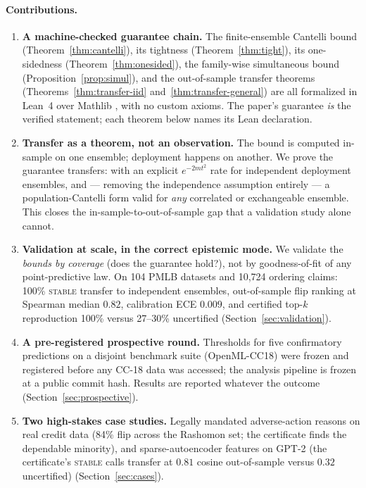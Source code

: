 \documentclass[10pt]{article}
\newcommand{\stab}{\textsc{stable}}
\begin{document}
\paragraph{Contributions.}
\begin{enumerate}[leftmargin=1.5em,itemsep=1pt,topsep=2pt]
\item \textbf{A machine-checked guarantee chain.} The finite-ensemble Cantelli bound
  (Theorem~\ref{thm:cantelli}), its tightness (Theorem~\ref{thm:tight}), its
  one-sidedness (Theorem~\ref{thm:onesided}), the family-wise simultaneous bound
  (Proposition~\ref{prop:simul}), and the out-of-sample transfer theorems
  (Theorems~\ref{thm:transfer-iid} and~\ref{thm:transfer-general}) are all formalized in
  Lean~4 \citep{demoura2021lean4} over Mathlib \citep{mathlib2020}, with no custom
  axioms. The paper's guarantee \emph{is} the verified statement; each theorem below
  names its Lean declaration.
\item \textbf{Transfer as a theorem, not an observation.} The bound is computed
  in-sample on one ensemble; deployment happens on another. We prove the guarantee
  transfers: with an explicit $e^{-2mt^2}$ rate for independent deployment ensembles,
  and --- removing the independence assumption entirely --- a population-Cantelli form
  valid for \emph{any} correlated or exchangeable ensemble. This closes the
  in-sample-to-out-of-sample gap that a validation study alone cannot.
\item \textbf{Validation at scale, in the correct epistemic mode.} We validate the
  \emph{bounds by coverage} (does the guarantee hold?), not by goodness-of-fit of any
  point-predictive law. On 104 PMLB datasets and 10{,}724 ordering claims: 100\% \stab{}
  transfer to independent ensembles, out-of-sample flip ranking at Spearman median
  $0.82$, calibration ECE $0.009$, and certified top-$k$ reproduction 100\% versus
  27--30\% uncertified (Section~\ref{sec:validation}).
\item \textbf{A pre-registered prospective round.} Thresholds for five confirmatory
  predictions on a disjoint benchmark suite (OpenML-CC18) were frozen and registered
  before any CC-18 data was accessed; the analysis pipeline is frozen at a public commit
  hash. Results are reported whatever the outcome (Section~\ref{sec:prospective}).
\item \textbf{Two high-stakes case studies.} Legally mandated adverse-action reasons on
  real credit data (84\% flip across the Rashomon set; the certificate finds the
  dependable minority), and sparse-autoencoder features on GPT-2 (the certificate's
  \stab{} calls transfer at $0.81$ cosine out-of-sample versus $0.32$ uncertified)
  (Section~\ref{sec:cases}).
\end{enumerate}
\end{document}
